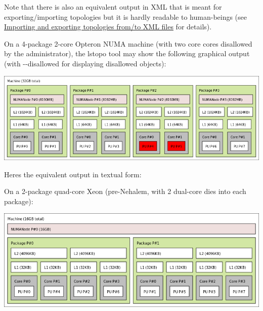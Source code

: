 Note that there is also an equivalent output in X\+ML that is meant for exporting/importing topologies but it is hardly readable to human-\/beings (see \hyperlink{a00388}{Importing and exporting topologies from/to X\+ML files} for details).

On a 4-\/package 2-\/core Opteron N\+U\+MA machine (with two core cores disallowed by the administrator), the {\ttfamily lstopo} tool may show the following graphical output (with {\ttfamily -\/-\/disallowed} for displaying disallowed objects)\+:

 
\begin{DoxyImageNoCaption}
  \mbox{\includegraphics[width=\textwidth]{hagrid.png}}
\end{DoxyImageNoCaption}


Here\textquotesingle{}s the equivalent output in textual form\+:



On a 2-\/package quad-\/core Xeon (pre-\/\+Nehalem, with 2 dual-\/core dies into each package)\+:

 
\begin{DoxyImageNoCaption}
  \mbox{\includegraphics[width=\textwidth]{emmett.png}}
\end{DoxyImageNoCaption}


